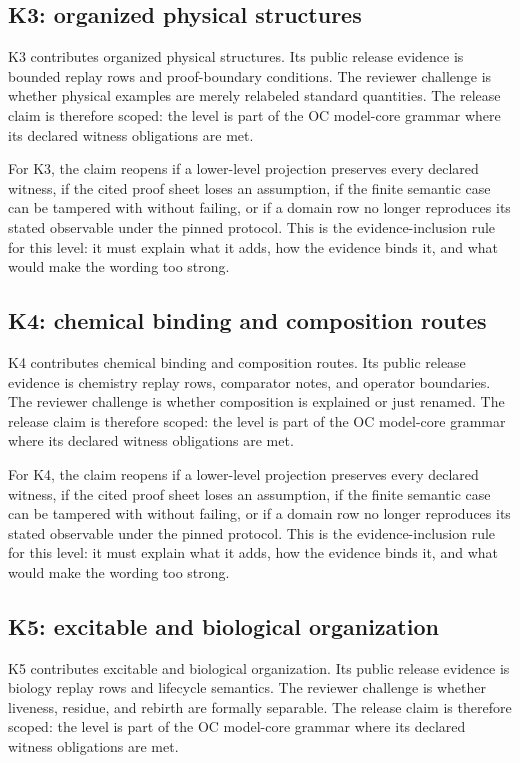 \subsection{K3: organized physical structures}

K3 contributes organized physical structures. Its public release evidence is bounded replay rows and proof-boundary conditions. The reviewer challenge is whether physical examples are merely relabeled standard quantities. The release claim is therefore scoped: the level is part of the OC model-core grammar where its declared witness obligations are met.


For K3, the claim reopens if a lower-level projection preserves every declared witness, if the cited proof sheet loses an assumption, if the finite semantic case can be tampered with without failing, or if a domain row no longer reproduces its stated observable under the pinned protocol. This is the evidence-inclusion rule for this level: it must explain what it adds, how the evidence binds it, and what would make the wording too strong.


\subsection{K4: chemical binding and composition routes}

K4 contributes chemical binding and composition routes. Its public release evidence is chemistry replay rows, comparator notes, and operator boundaries. The reviewer challenge is whether composition is explained or just renamed. The release claim is therefore scoped: the level is part of the OC model-core grammar where its declared witness obligations are met.


For K4, the claim reopens if a lower-level projection preserves every declared witness, if the cited proof sheet loses an assumption, if the finite semantic case can be tampered with without failing, or if a domain row no longer reproduces its stated observable under the pinned protocol. This is the evidence-inclusion rule for this level: it must explain what it adds, how the evidence binds it, and what would make the wording too strong.


\subsection{K5: excitable and biological organization}

K5 contributes excitable and biological organization. Its public release evidence is biology replay rows and lifecycle semantics. The reviewer challenge is whether liveness, residue, and rebirth are formally separable. The release claim is therefore scoped: the level is part of the OC model-core grammar where its declared witness obligations are met.



